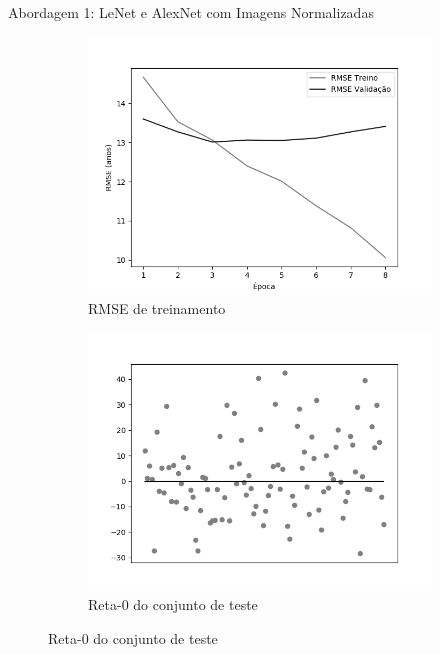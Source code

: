 \begin{frame}{\large{Abordagem 1: LeNet e AlexNet com Imagens Normalizadas}}
\begin{figure}[h!]
  \caption{Resultados do treinamento e teste da CNN LeNet \emph{ReLU}}
  \begin{subfigure}[hb]{0.4\textwidth}
    \caption{RMSE de treinamento}
    \includegraphics[width=\linewidth]{img/graficos/history/lenet/fig-history-image-treat-1-lenet-relu-rmse.png}%
  \end{subfigure}%
  \begin{subfigure}[hb]{0.4\textwidth}
    \caption{Reta-0 do conjunto de teste}
    \includegraphics[width=\linewidth]{img/graficos/reta0/lenet/fig-reta-0-image-treat-1-lenet-relu.png}%
  \end{subfigure}
\end{figure}
\end{frame}

